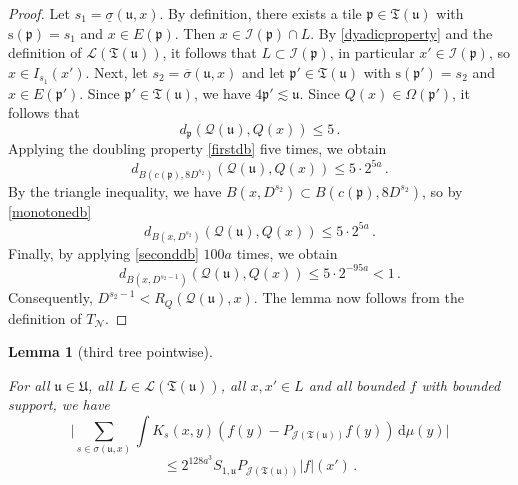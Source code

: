 \documentclass[10pt,a4paper]{article}
\theoremstyle{plain}
\newtheorem{lemma}[theorem]{Lemma}
\theoremstyle{definition}
\numberwithin{equation}{subsection}
\newcommand{\fp}{{\mathfrak p}}
\newcommand{\fu}{{\mathfrak u}}
\newcommand{\fU}{{\mathfrak U}}
\newcommand{\fT}{{\mathfrak T}}
\newcommand{\ps}{{\mathrm{s}}}
\newcommand{\fc}{{\Omega}}
\newcommand{\scI}{{\mathcal{I}}} %
\newcommand{\tQ}{{Q}}
\newcommand{\fcc}{{\mathcal{Q}}}
\newcommand{\lean}[1]{}
\newcommand{\leanok}{}
\begin{document}
\begin{proof}
    \leanok
    Let $s_1 = \underline{\sigma}(\fu, x)$. By definition, there exists a tile $\fp \in \fT(\fu)$ with $\ps(\fp) = s_1$ and $x \in E(\fp)$. Then $x \in \scI(\fp) \cap L$. By \eqref{dyadicproperty} and the definition of $\mathcal{L}(\fT(\fu))$, it follows that $L \subset \scI(\fp)$, in particular $x' \in \scI(\fp)$, so $x \in I_{s_1}(x')$.
    Next, let $s_2 = \overline{\sigma}(\fu, x)$ and let $\fp' \in \fT(\fu)$ with $\ps(\fp') = s_2$ and $x \in E(\fp')$. Since $\fp' \in \fT(\fu)$, we have $4\fp' \lesssim \fu$. Since $\tQ(x) \in \fc(\fp')$, it follows that
    $$
        d_{\fp}(\fcc(\fu), \tQ(x)) \le 5\,.
    $$
    Applying the doubling property \eqref{firstdb} five times, we obtain
    $$
        d_{B(c(\fp), 8D^{s_2})}(\fcc(\fu), \tQ(x)) \le 5 \cdot 2^{5a}\,.
    $$
    By the triangle inequality, we have $B(x, D^{s_2}) \subset B(c(\fp), 8 D^{s_2})$, so by \eqref{monotonedb}
    $$
        d_{B(x, D^{s_2})}(\fcc(\fu), \tQ(x)) \le 5 \cdot 2^{5a}\,.
    $$
    Finally, by applying \eqref{seconddb} $100a$ times, we obtain
    $$
        d_{B(x, D^{s_2-1})}(\fcc(\fu), \tQ(x)) \le 5 \cdot 2^{-95a} < 1\,.
    $$
    Consequently, $D^{s_2 - 1} < R_Q(\fcc(\fu), x)$.
    The lemma now follows from the definition of $T_{\mathcal{N}}$.
\end{proof}

\begin{lemma}[third tree pointwise]
    \label{third-tree-pointwise}
    \leanok
    \lean{TileStructure.Forest.third_tree_pointwise}
    For all $\fu \in \fU$, all $L \in \mathcal{L}(\fT(\fu))$, all $x, x' \in L$ and all bounded $f$ with bounded support, we have
    \begin{equation*}
        \Bigg| \sum_{s \in \sigma(\fu, x)} \int K_s(x,y) (f(y) - P_{\mathcal{J}(\fT(\fu))} f(y)) \, \mathrm{d}\mu(y) \Bigg|
    \end{equation*}
    \begin{equation*}
          \le 2^{128a^3} S_{1,\fu} P_{\mathcal{J}(\fT(\fu))}|f|(x')\,.
    \end{equation*}
\end{lemma}
\end{document}
